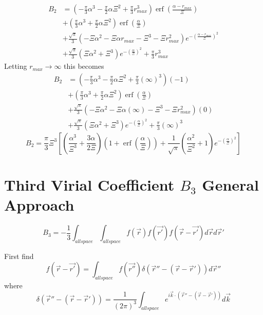 \documentclass[double,12pt]{beavtex}
\begin{document}
\begin{align}
  B_2 &= \left(-\frac{\pi}{3}\alpha^3-\frac{\pi}{2}\alpha\Xi^2+\frac{\pi}{3}r_{max}^3\right)\operatorname{erf}\left(\frac{\alpha-r_{max}}{\Xi}\right) \nonumber \\
      &+ \left(\frac{\pi}{3}\alpha^3+\frac{\pi}{2}\alpha\Xi^2\right)\operatorname{erf}\left(\frac{\alpha}{\Xi}\right) \nonumber \\
      &+ \frac{\sqrt{\pi}}{3}\left(-\Xi\alpha^2-\Xi\alpha r_{max}-\Xi^3-\Xi r_{max}^2\right)e^{-{\left(\frac{\alpha-r_{max}}{\Xi}\right)^2}} \nonumber \\
      &+ \frac{\sqrt{\pi}}{3}\left(\Xi\alpha^2+\Xi^3\right)e^{-\left(\frac{\alpha}{\Xi}\right)^2}+\frac{\pi}{3}r_{max}^3 
\end{align}
Letting $r_{max}\rightarrow\infty$ this becomes
\begin{align}
  B_2 &= \left(-\frac{\pi}{3}\alpha^3-\frac{\pi}{2}\alpha\Xi^2+\frac{\pi}{3}\left(\infty\right)^3\right)\left(-1\right) \nonumber \\
      &+ \left(\frac{\pi}{3}\alpha^3+\frac{\pi}{2}\alpha\Xi^2\right)\operatorname{erf}\left(\frac{\alpha}{\Xi}\right) \nonumber \\
      &+ \frac{\sqrt{\pi}}{3}\left(-\Xi\alpha^2-\Xi\alpha\left(\infty\right)-\Xi^3-\Xi r_{max}^2\right)\left(0\right) \nonumber \\
      &+ \frac{\sqrt{\pi}}{3}\left(\Xi\alpha^2+\Xi^3\right)e^{-\left(\frac{\alpha}{\Xi}\right)^2}+\frac{\pi}{3}\left(\infty\right)^3 
\end{align}
\begin{equation}B_2 = \frac{\pi}{3}\Xi^3\left[\left(\frac{\alpha^3}{\Xi^3}+\frac{3\alpha}{2\Xi}\right)\left(1+\operatorname{erf}\left(\frac{\alpha}{\Xi}\right)\right)+\frac{1}{\sqrt{\pi}}\left(\frac{\alpha^2}{\Xi^2}+1\right)e^{-\left(\frac{\alpha}{\Xi}\right)^2}\right]\end{equation}

\section{Third Virial Coefficient $B_{3}$ General Approach}

\begin{equation}\label{B3}B_3=-\frac{1}{3}\int_{allspace}\int_{allspace}f(\vec{r})f(\vec{r'})f(\vec{r}-\vec{r'})d\vec rd\vec r'\end{equation}

First find
\begin{equation}f(\vec{r}-\vec{r'})=\int_{allspace}f(\vec{r''})\delta(\vec{r}''-(\vec{r}-\vec{r}'))d\vec r'' \end{equation}
where
\begin{equation}{\delta}(\vec{r}''-(\vec{r}-\vec{r}'))={ \frac{1}{\left(2\pi\right)^3}\int_{allspace} e^{i\vec k\cdot (\vec{r}''-(\vec r-\vec r'))}d\vec{k}}\end{equation} 
\end{document}
